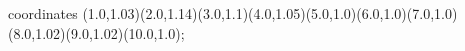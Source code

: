 					coordinates { (1.0,1.03)(2.0,1.14)(3.0,1.1)(4.0,1.05)(5.0,1.0)(6.0,1.0)(7.0,1.0)(8.0,1.02)(9.0,1.02)(10.0,1.0)};